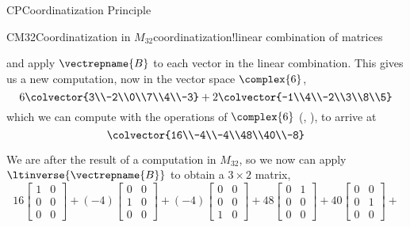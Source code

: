 \begin{subsect}{CP}{Coordinatization Principle}
\begin{example}{CM32}{Coordinatization in $M_{32}$}{coordinatization!linear combination of matrices}
\begin{para}
\begin{equation*}
{}
\end{equation*}
%
and apply $\vectrepname{B}$ to each vector in the linear combination.  This gives us a new computation, now in the vector space $\complex{6}$,
%
\begin{equation*}
6\colvector{3\\-2\\0\\7\\4\\-3}+2\colvector{-1\\4\\-2\\3\\8\\5}
\end{equation*}
%
which we can compute with the operations of $\complex{6}$ (, ), to arrive at
%
\begin{equation*}
\colvector{16\\-4\\-4\\48\\40\\-8}
\end{equation*}
\end{para}
%
\begin{para}We are after the result of a computation in $M_{32}$, so we now can apply $\ltinverse{\vectrepname{B}}$ to obtain a $3\times 2$ matrix,
%
\begin{equation*}
16\begin{bmatrix}1&0\\0&0\\0&0\end{bmatrix}+
(-4)\begin{bmatrix}0&0\\1&0\\0&0\end{bmatrix}+
(-4)\begin{bmatrix}0&0\\0&0\\1&0\end{bmatrix}+
48\begin{bmatrix}0&1\\0&0\\0&0\end{bmatrix}+
40\begin{bmatrix}0&0\\0&1\\0&0\end{bmatrix}+

\end{equation*}
\end{para}
\end{example}
\end{subsect}
